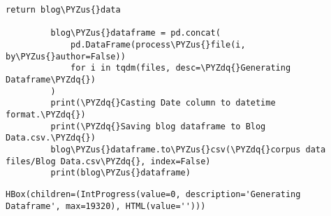 \documentclass[11pt]{article}
\def\PYZus{\char`\_}
\def\PYZdq{\char`\"}
\begin{document}
\begin{Verbatim}[commandchars=\\\{\}]
             return blog\PYZus{}data
         
         blog\PYZus{}dataframe = pd.concat(
             pd.DataFrame(process\PYZus{}file(i, by\PYZus{}author=False))
             for i in tqdm(files, desc=\PYZdq{}Generating Dataframe\PYZdq{})
         )
         print(\PYZdq{}Casting Date column to datetime format.\PYZdq{})
         print(\PYZdq{}Saving blog dataframe to Blog Data.csv.\PYZdq{})
         blog\PYZus{}dataframe.to\PYZus{}csv(\PYZdq{}corpus data files/Blog Data.csv\PYZdq{}, index=False)
         print(blog\PYZus{}dataframe)
\end{Verbatim}


    
    \begin{verbatim}
HBox(children=(IntProgress(value=0, description='Generating Dataframe', max=19320), HTML(value='')))
    \end{verbatim}
\end{document}
